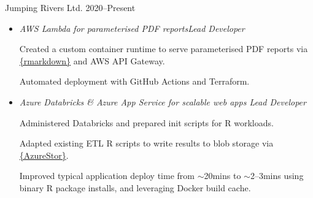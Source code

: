 \documentclass[12pt, a4paper]{article}
\begin{document}

\makecard





%
        {Jumping Rivers Ltd.}%
        {2020--Present}

\vspace{-1em}


\begin{itemize}[
    itemsep=.05em,
    labelwidth=2em,
    leftmargin=1.5em,
    topsep=0em]

    \item[]  
                   {\emph{AWS Lambda for parameterised PDF reports\hfill{}Lead Developer}

                    Created a custom container runtime to serve parameterised PDF reports via
                    \href{https://rmarkdown.rstudio.com/}{\{rmarkdown\}} and AWS API Gateway.

                    Automated deployment with GitHub Actions and Terraform.}%

    \item[]  
                   {\emph{Azure Databricks \& Azure App Service for scalable web apps
                    \hfill{}Lead Developer}

                    Administered Databricks and prepared init scripts for R workloads.

                    Adapted existing ETL R scripts to write results to blob storage via
                    \href{https://cran.r-project.org/web/packages/AzureStor/vignettes/intro.html}%
                         {\{AzureStor\}}.

                    Improved typical application deploy time from $\sim$20mins to $\sim$2--3mins
                    using binary R package installs, and leveraging Docker build cache.}%

\end{itemize}

\vspace{-.75em}

\end{document}

